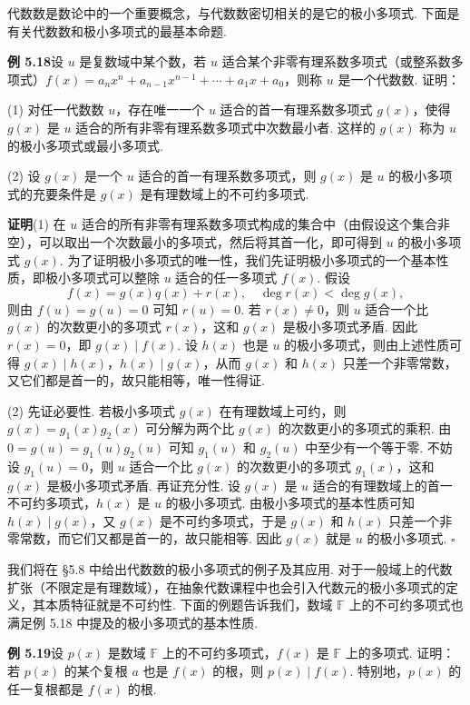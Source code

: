 \documentclass[UTF8, 12pt, fontset=fandol, oneside]{ctexart}
\begin{document}
代数数是数论中的一个重要概念，与代数数密切相关的是它的极小多项式. 下面是有关代数数和极小多项式的最基本命题.

\noindent\textbf{例 5.18}\quad 设 $u$ 是复数域中某个数，若 $u$ 适合某个非零有理系数多项式（或整系数多项式）$f(x)=a_nx^n+a_{n-1}x^{n-1}+\cdots+a_1x+a_0$，则称 $u$ 是一个代数数. 证明：

(1) 对任一代数数 $u$，存在唯一一个 $u$ 适合的首一有理系数多项式 $g(x)$，使得 $g(x)$ 是 $u$ 适合的所有非零有理系数多项式中次数最小者. 这样的 $g(x)$ 称为 $u$ 的极小多项式或最小多项式.

(2) 设 $g(x)$ 是一个 $u$ 适合的首一有理系数多项式，则 $g(x)$ 是 $u$ 的极小多项式的充要条件是 $g(x)$ 是有理数域上的不可约多项式.

\noindent\textbf{证明}\quad (1) 在 $u$ 适合的所有非零有理系数多项式构成的集合中（由假设这个集合非空），可以取出一个次数最小的多项式，然后将其首一化，即可得到 $u$ 的极小多项式 $g(x)$. 为了证明极小多项式的唯一性，我们先证明极小多项式的一个基本性质，即极小多项式可以整除 $u$ 适合的任一多项式 $f(x)$. 假设
\[
f(x)=g(x)q(x)+r(x),\quad \deg r(x)<\deg g(x),
\]
则由 $f(u)=g(u)=0$ 可知 $r(u)=0$. 若 $r(x)\ne0$，则 $u$ 适合一个比 $g(x)$ 的次数更小的多项式 $r(x)$，这和 $g(x)$ 是极小多项式矛盾. 因此 $r(x)=0$，即 $g(x)\mid f(x)$. 设 $h(x)$ 也是 $u$ 的极小多项式，则由上述性质可得 $g(x)\mid h(x)$，$h(x)\mid g(x)$，从而 $g(x)$ 和 $h(x)$ 只差一个非零常数，又它们都是首一的，故只能相等，唯一性得证.

(2) 先证必要性. 若极小多项式 $g(x)$ 在有理数域上可约，则 $g(x)=g_1(x)g_2(x)$ 可分解为两个比 $g(x)$ 的次数更小的多项式的乘积. 由 $0=g(u)=g_1(u)g_2(u)$ 可知 $g_1(u)$ 和 $g_2(u)$ 中至少有一个等于零. 不妨设 $g_1(u)=0$，则 $u$ 适合一个比 $g(x)$ 的次数更小的多项式 $g_1(x)$，这和 $g(x)$ 是极小多项式矛盾. 再证充分性. 设 $g(x)$ 是 $u$ 适合的有理数域上的首一不可约多项式，$h(x)$ 是 $u$ 的极小多项式. 由极小多项式的基本性质可知 $h(x)\mid g(x)$，又 $g(x)$ 是不可约多项式，于是 $g(x)$ 和 $h(x)$ 只差一个非零常数，而它们又都是首一的，故只能相等. 因此 $g(x)$ 就是 $u$ 的极小多项式. \hfill $\square$

我们将在 §5.8 中给出代数数的极小多项式的例子及其应用. 对于一般域上的代数扩张（不限定是有理数域），在抽象代数课程中也会引入代数元的极小多项式的定义，其本质特征就是不可约性. 下面的例题告诉我们，数域 $\mathbb{F}$ 上的不可约多项式也满足例 5.18 中提及的极小多项式的基本性质.

\noindent\textbf{例 5.19}\quad 设 $p(x)$ 是数域 $\mathbb{F}$ 上的不可约多项式，$f(x)$ 是 $\mathbb{F}$ 上的多项式. 证明：若 $p(x)$ 的某个复根 $a$ 也是 $f(x)$ 的根，则 $p(x)\mid f(x)$. 特别地，$p(x)$ 的任一复根都是 $f(x)$ 的根.
\end{document}
